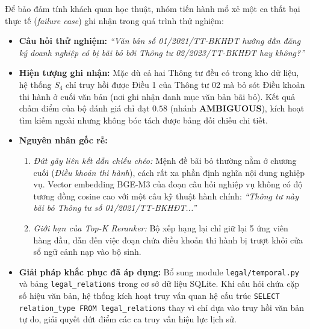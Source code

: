 Để bảo đảm tính khách quan học thuật, nhóm tiến hành mổ xẻ một ca thất bại thực tế (\textit{failure case}) ghi nhận trong quá trình thử nghiệm:
\begin{itemize}
    \item \textbf{Câu hỏi thử nghiệm:} \textit{“Văn bản số 01/2021/TT-BKHĐT hướng dẫn đăng ký doanh nghiệp có bị bãi bỏ bởi Thông tư 02/2023/TT-BKHĐT hay không?”}
    \item \textbf{Hiện tượng ghi nhận:} Mặc dù cả hai Thông tư đều có trong kho dữ liệu, hệ thống $S_4$ chỉ truy hồi được Điều 1 của Thông tư 02 mà bỏ sót Điều khoản thi hành ở cuối văn bản (nơi ghi nhận danh mục văn bản bãi bỏ). Kết quả chấm điểm của bộ đánh giá chỉ đạt $0.58$ (nhánh \textbf{AMBIGUOUS}), kích hoạt tìm kiếm ngoài nhưng không bóc tách được bảng đối chiếu chi tiết.
    \item \textbf{Nguyên nhân gốc rễ:}
    \begin{enumerate}
        \item \textit{Đứt gãy liên kết dẫn chiếu chéo:} Mệnh đề bãi bỏ thường nằm ở chương cuối (\textit{Điều khoản thi hành}), cách rất xa phần định nghĩa nội dung nghiệp vụ. Vector embedding BGE-M3 của đoạn câu hỏi nghiệp vụ không có độ tương đồng cosine cao với một câu kỹ thuật hành chính: \textit{“Thông tư này bãi bỏ Thông tư số 01/2021/TT-BKHĐT...”}
        \item \textit{Giới hạn của Top-K Reranker:} Bộ xếp hạng lại chỉ giữ lại 5 ứng viên hàng đầu, dẫn đến việc đoạn chứa điều khoản thi hành bị trượt khỏi cửa sổ ngữ cảnh nạp vào bộ sinh.
    \end{enumerate}
    \item \textbf{Giải pháp khắc phục đã áp dụng:} Bổ sung module \texttt{legal/temporal.py} và bảng \texttt{legal\_relations} trong cơ sở dữ liệu SQLite. Khi câu hỏi chứa cặp số hiệu văn bản, hệ thống kích hoạt truy vấn quan hệ cấu trúc \texttt{SELECT relation\_type FROM legal\_relations} thay vì chỉ dựa vào truy hồi văn bản tự do, giải quyết dứt điểm các ca truy vấn hiệu lực lịch sử.
\end{itemize}
